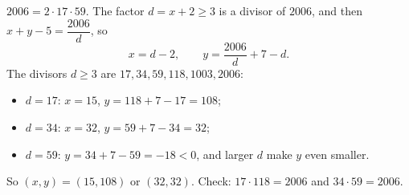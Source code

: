 $2006=2\cdot17\cdot59$. The factor $d=x+2\ge3$ is a divisor of $2006$, and then $x+y-5=\dfrac{2006}d$, so
\[x=d-2,\qquad y=\dfrac{2006}{d}+7-d.\]
The divisors $d\ge3$ are $17,34,59,118,1003,2006$:
\begin{itemize}
\item $d=17$: $x=15$, $y=118+7-17=108$;
\item $d=34$: $x=32$, $y=59+7-34=32$;
\item $d=59$: $y=34+7-59=-18<0$, and larger $d$ make $y$ even smaller.
\end{itemize}
So $\boxed{(x,y)=(15,108)\text{ or }(32,32)}$. Check: $17\cdot118=2006$ and $34\cdot59=2006$.
